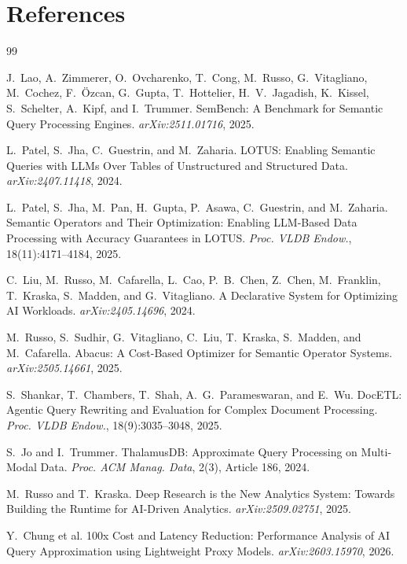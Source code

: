 \documentclass[11pt]{article}
\begin{document}
\section*{References}
\begin{thebibliography}{99}\small

J.~Lao, A.~Zimmerer, O.~Ovcharenko, T.~Cong, M.~Russo, G.~Vitagliano, M.~Cochez, F.~{\"O}zcan, G.~Gupta, T.~Hottelier, H.~V.~Jagadish, K.~Kissel, S.~Schelter, A.~Kipf, and I.~Trummer.
\newblock SemBench: A Benchmark for Semantic Query Processing Engines.
\newblock \emph{arXiv:2511.01716}, 2025.

L.~Patel, S.~Jha, C.~Guestrin, and M.~Zaharia.
\newblock LOTUS: Enabling Semantic Queries with LLMs Over Tables of Unstructured and Structured Data.
\newblock \emph{arXiv:2407.11418}, 2024.

L.~Patel, S.~Jha, M.~Pan, H.~Gupta, P.~Asawa, C.~Guestrin, and M.~Zaharia.
\newblock Semantic Operators and Their Optimization: Enabling LLM-Based Data Processing with Accuracy Guarantees in LOTUS.
\newblock \emph{Proc. VLDB Endow.}, 18(11):4171--4184, 2025.

C.~Liu, M.~Russo, M.~Cafarella, L.~Cao, P.~B.~Chen, Z.~Chen, M.~Franklin, T.~Kraska, S.~Madden, and G.~Vitagliano.
\newblock A Declarative System for Optimizing AI Workloads.
\newblock \emph{arXiv:2405.14696}, 2024.

M.~Russo, S.~Sudhir, G.~Vitagliano, C.~Liu, T.~Kraska, S.~Madden, and M.~Cafarella.
\newblock Abacus: A Cost-Based Optimizer for Semantic Operator Systems.
\newblock \emph{arXiv:2505.14661}, 2025.

S.~Shankar, T.~Chambers, T.~Shah, A.~G.~Parameswaran, and E.~Wu.
\newblock DocETL: Agentic Query Rewriting and Evaluation for Complex Document Processing.
\newblock \emph{Proc. VLDB Endow.}, 18(9):3035--3048, 2025.

S.~Jo and I.~Trummer.
\newblock ThalamusDB: Approximate Query Processing on Multi-Modal Data.
\newblock \emph{Proc. ACM Manag. Data}, 2(3), Article 186, 2024.

M.~Russo and T.~Kraska.
\newblock Deep Research is the New Analytics System: Towards Building the Runtime for AI-Driven Analytics.
\newblock \emph{arXiv:2509.02751}, 2025.

Y.~Chung et al.
\newblock 100x Cost and Latency Reduction: Performance Analysis of AI Query Approximation using Lightweight Proxy Models.
\newblock \emph{arXiv:2603.15970}, 2026.


\end{thebibliography}
\end{document}
